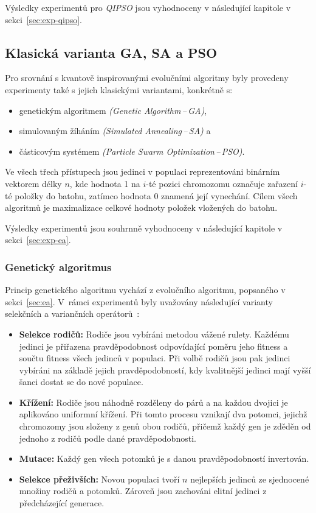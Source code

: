 Výsledky experimentů pro \emph{QIPSO} jsou vyhodnoceny v následující kapitole v sekci~\ref{sec:exp-qipso}.

\newpage
\subsection*{Klasická varianta GA, SA a PSO}
Pro srovnání s kvantově inspirovanými evolučními algoritmy byly provedeny experimenty také s jejich klasickými variantami, konkrétně s:
\begin{itemize}
    \item genetickým algoritmem \emph{(Genetic Algorithm\,--\,GA)},
    \item simulovaným žíháním \emph{(Simulated Annealing\,--\,SA)} a
    \item částicovým systémem \emph{(Particle Swarm Optimization\,--\,PSO)}.
\end{itemize}
Ve všech třech přístupech jsou jedinci v populaci reprezentováni binárním vektorem délky $n$, kde hodnota 1 na $i$-té pozici chromozomu označuje zařazení $i$-té položky do batohu, zatímco hodnota 0 znamená její vynechání. 
Cílem všech algoritmů je maximalizace celkové hodnoty položek vložených do batohu.

Výsledky experimentů jsou souhrnně vyhodnoceny v následující kapitole v sekci~\ref{sec:exp-ea}.

\subsubsection*{Genetický algoritmus}
Princip genetického algoritmu vychází z evolučního algoritmu, popsaného v sekci~\ref{sec:ea}. 
V~rám\-ci experimentů byly uvažovány následující varianty selekčních a variančních operátorů~\cite{ga-app}: 
\begin{itemize}
    \item \textbf{Selekce rodičů:} Rodiče jsou vybíráni metodou vážené rulety. 
        Každému jedinci je přiřazena pravděpodobnost odpovídající poměru jeho fitness a součtu fitness všech jedinců v populaci. 
        Při volbě rodičů jsou pak jedinci vybíráni na základě jejich pravděpodobností, kdy kvalitnější jedinci mají vyšší šanci dostat se do nové populace. 
    \item \textbf{Křížení:} Rodiče jsou náhodně rozděleny do párů a na každou dvojici je aplikováno uniformní křížení. 
        Při tomto procesu vznikají dva potomci, jejichž chromozomy jsou složeny z genů obou rodičů, přičemž každý gen je zděděn od jednoho z rodičů podle dané pravděpodobnosti.
    \item \textbf{Mutace:} Každý gen všech potomků je s danou pravděpodobností invertován.
    \item \textbf{Selekce přeživších:} Novou populaci tvoří $n$ nejlepších jedinců ze sjednocené množiny rodičů a potomků. 
        Zároveň jsou zachováni elitní jedinci z předcházející generace. 
\end{itemize}

